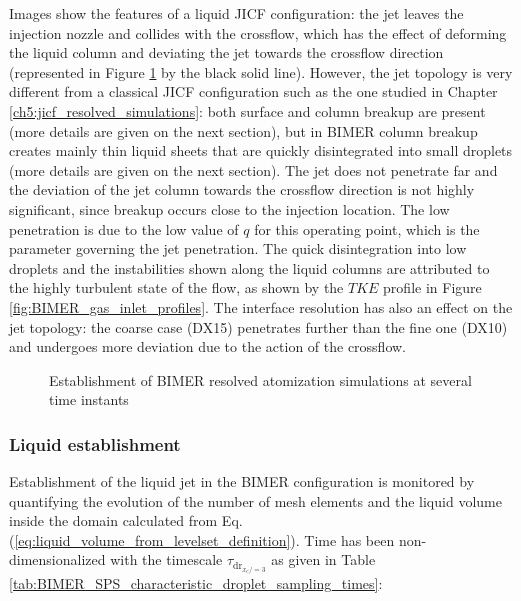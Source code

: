 Images show the features of a liquid JICF configuration: the jet leaves the injection nozzle and collides with the crossflow, which has the effect of deforming the liquid column and deviating the jet towards the crossflow direction (represented in Figure \ref{fig:BIMER_jet_establishment} by the black solid line). However, the jet topology is very different from a classical JICF configuration such as the one studied in Chapter \ref{ch5:jicf_resolved_simulations}: both surface and column breakup are present (more details are given on the next section), but in BIMER column breakup creates mainly thin liquid sheets that are quickly disintegrated into small droplets (more details are given on the next section). The jet does not penetrate far and the deviation of the jet column towards the crossflow direction is not highly significant, since breakup occurs close to the injection location. The low penetration is due to the low value of $q$ for this operating point, which is the parameter governing the jet penetration. The quick disintegration into low droplets and the instabilities shown along the liquid columns are attributed to the highly turbulent state of the flow, as shown by the $TKE$ profile in Figure \ref{fig:BIMER_gas_inlet_profiles}. The interface resolution has also an effect on the jet topology: the coarse case (DX15) penetrates further than the fine one (DX10) and undergoes more deviation due to the action of the crossflow. 


\clearpage

\begin{figure}[ht]
\centering
{}
\caption{Establishment of BIMER resolved atomization simulations at several time instants}
\label{fig:BIMER_jet_establishment}
\end{figure}

\clearpage


\subsubsection*{Liquid establishment}

Establishment of the liquid jet in the BIMER configuration is monitored by quantifying the evolution of the number of mesh elements and the liquid volume inside the domain calculated from Eq. (\ref{eq:liquid_volume_from_levelset_definition}). Time has been non-dimensionalized with the timescale $\tau_{\mathrm{dr}_{x_c/=3}}$ as given in Table \ref{tab:BIMER_SPS_characteristic_droplet_sampling_times}:



